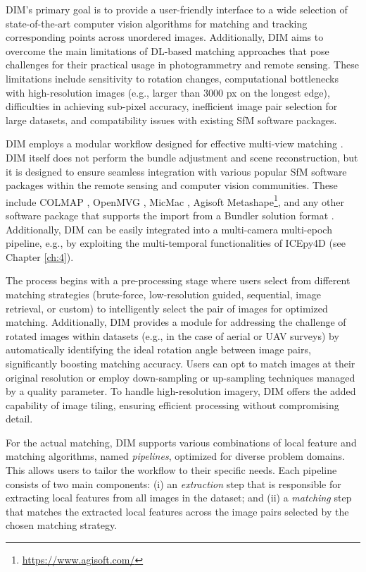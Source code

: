 DIM's primary goal is to provide a user-friendly interface to a wide selection of state-of-the-art computer vision algorithms for matching and tracking corresponding points across unordered images.
Additionally, DIM aims to overcome the main limitations of DL-based matching approaches that pose challenges for their practical usage in photogrammetry and remote sensing. 
These limitations include sensitivity to rotation changes, computational bottlenecks with high-resolution images (e.g., larger than 3000 px on the longest edge), difficulties in achieving sub-pixel accuracy, inefficient image pair selection for large datasets, and compatibility issues with existing SfM software packages.  

DIM employs a modular workflow designed for effective multi-view matching .
DIM itself does not perform the bundle adjustment and scene reconstruction, but it is designed to ensure seamless integration with various popular SfM software packages within the remote sensing and computer vision communities. 
These include COLMAP \citep{schoenberger2016sfm}, OpenMVG \citep{moulon2016openmvg}, MicMac \citep{rupnik2017micmac}, Agisoft Metashape\footnote{\url{https://www.agisoft.com/}}, 
and any other software package that supports the import from a Bundler solution format \citep{Li_Snavely_2018_MegaDepth}.
Additionally, DIM can be easily integrated into a multi-camera multi-epoch pipeline, e.g., by exploiting the multi-temporal functionalities of ICEpy4D (see Chapter \ref{ch:4}).

The process begins with a pre-processing stage where users select from different matching strategies (brute-force, low-resolution guided, sequential, image retrieval, or custom) to intelligently select the pair of images for optimized matching. 
Additionally, DIM provides a module for addressing the challenge of rotated images within datasets (e.g., in the case of aerial or UAV surveys) by automatically identifying the ideal rotation angle between image pairs, significantly boosting matching accuracy. Users can opt to match images at their original resolution or employ down-sampling or up-sampling techniques managed by a quality parameter.
To handle high-resolution imagery, DIM offers the added capability of image tiling, ensuring efficient processing without compromising detail. 

For the actual matching, DIM supports various combinations of local feature and matching algorithms, named \textit{pipelines}, optimized for diverse problem domains. This allows users to tailor the workflow to their specific needs. 
Each pipeline consists of two main components: (i) an \textit{extraction} step that is responsible for extracting local features from all images in the dataset; and (ii) a \textit{matching} step that matches the extracted local features across the image pairs selected by the chosen matching strategy.  

